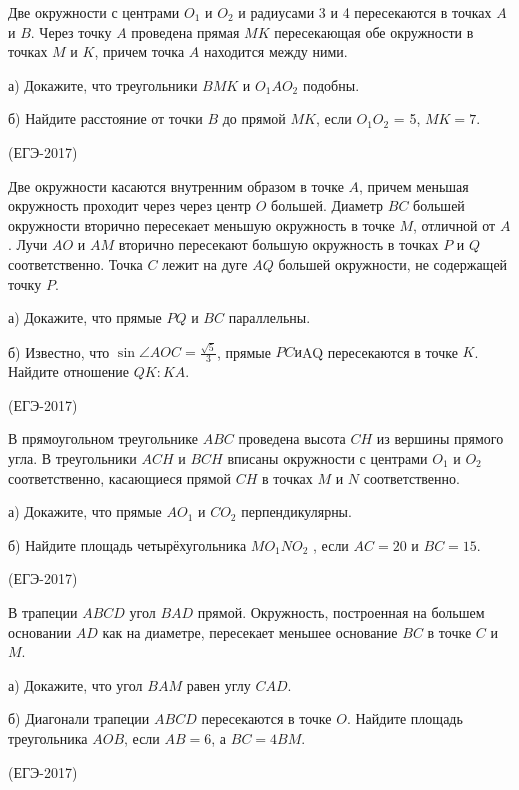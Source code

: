 \documentclass[c,12pt]{beamer}  %
\begin{document}
	\begin{frame}
		\begin{block}{}
			Две окружности с центрами $ O_1$ и $ O_2$ и радиусами 3 и 4
			пересекаются в точках $A$ и $B$. Через точку $A$ проведена прямая
		 $MK$ пересекающая обе окружности в точках $M$ и $K$, причем
			точка $A$ находится между ними.
			
			а) Докажите, что треугольники $BMK$ и $O_1 A O_2$ подобны.
			
			б) Найдите расстояние от точки $B$ до прямой $MK$, если
			$O_1 O_2$ = 5, $MK = 7$.
			
			(ЕГЭ-2017)
		\end{block}
	\end{frame}

	\begin{frame}
		\begin{block}{}
			Две окружности касаются внутренним образом в точке $A$, причем
			меньшая окружность проходит через через центр $O$ большей.
			Диаметр $BC$ большей окружности вторично пересекает меньшую
			окружность в точке $M$, отличной от $A$. Лучи $AO$ и $AM$ вторично
			пересекают большую окружность в точках $P$ и $Q$ соответственно.
			Точка $C$ лежит на дуге $AQ$ большей окружности, не содержащей
			точку $P$.
			
			а) Докажите, что прямые $PQ$ и $BC$ параллельны.
			
			б) Известно, что $ \sin \angle AOC = \frac{\sqrt5}{3}$, прямые $PC и $AQ
			пересекаются в точке $K$. Найдите отношение $QK : KA$.
			
			(ЕГЭ-2017)
		\end{block}
	\end{frame}

	\begin{frame}
		\begin{block}{}
			В прямоугольном треугольнике $ABC$ проведена высота $CH$ из
			вершины прямого угла. В треугольники $ACH$ и $BCH$ вписаны
			окружности с центрами $O_1$ и $O_2$ соответственно, касающиеся
			прямой $CH$ в точках $M$ и $N$ соответственно.
			
			а) Докажите, что прямые $AO_1$ и $CO_2$ перпендикулярны.
			
			б) Найдите площадь четырёхугольника $MO_1 NO_2$ , если $AC = 20$ и
		 $BC = 15$.
			
			(ЕГЭ-2017)
		\end{block}
	\end{frame}

	\begin{frame}
		\begin{block}{}
			В трапеции $ABCD$ угол $BAD$ прямой. Окружность, построенная
			на большем основании $AD$ как на диаметре, пересекает меньшее
			основание $BC$ в точке $C$ и $M$.
			
			а) Докажите, что угол $BAM$ равен углу $CAD$.
			
			б) Диагонали трапеции $ABCD$ пересекаются в точке $O$. Найдите
			площадь треугольника $AOB$, если $AB = 6$, а $BC = 4BM$.
			
			(ЕГЭ-2017)
		\end{block}
	\end{frame}
\end{document}
